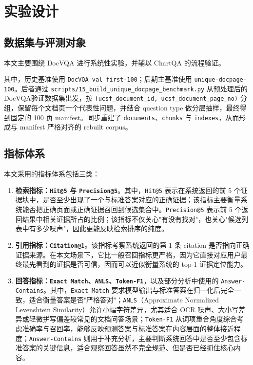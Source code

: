 \documentclass{SYSUReport}
\begin{document}
\section{实验设计}

\subsection{数据集与评测对象}

本文主要围绕 DocVQA 进行系统性实验，并辅以 ChartQA 的流程验证。

其中，历史基准使用 \texttt{DocVQA val first-100}；后期主基准使用 \texttt{unique-docpage-100}。后者通过 \texttt{scripts/15\_build\_unique\_docpage\_benchmark.py} 从预处理后的DocVQA验证数据集出发，按 \texttt{(ucsf\_document\_id, ucsf\_document\_page\_no)} 分组，保留每个文档页一个代表性问题，并结合 question type 做分层抽样，最终得到固定的 100 页 manifest。同步重建了 \texttt{documents}、\texttt{chunks} 与 \texttt{indexes}，从而形成与 manifest 严格对齐的 rebuilt corpus。

\subsection{指标体系}

本文采用的指标体系包括三类：

\begin{enumerate}
    \item \textbf{检索指标：\texttt{Hit@5} 与 \texttt{Precision@5}}。其中，\texttt{Hit@5} 表示在系统返回的前 5 个证据块中，是否至少出现了一个与标准答案对应的正确证据；该指标主要衡量系统能否把正确页面或正确证据召回到候选集合中。\texttt{Precision@5} 表示前 5 个返回结果中相关证据所占的比例；该指标不仅关心"有没有找对"，也关心"候选列表中有多少噪声"，因此更能反映检索排序的纯度。
    \item \textbf{引用指标：\texttt{Citation@1}}。该指标考察系统返回的第 1 条 citation 是否指向正确证据来源。在本文场景下，它比一般召回指标更严格，因为它直接对应用户最终最先看到的证据是否可信，因而可以近似衡量系统的 top-1 证据定位能力。
    \item \textbf{回答指标：\texttt{Exact Match}、\texttt{ANLS}、\texttt{Token-F1}}，以及部分分析中使用的 \texttt{Answer-Contains}。其中，\texttt{Exact Match} 要求模型输出与标准答案在归一化后完全一致，适合衡量答案是否"严格答对"；\texttt{ANLS}（Approximate Normalized Levenshtein Similarity）允许小幅字符差异，尤其适合 OCR 噪声、大小写差异或轻微拼写偏差较常见的文档问答场景；\texttt{Token-F1} 从词项重合角度综合考虑准确率与召回率，能够反映预测答案与标准答案在内容层面的整体接近程度；\texttt{Answer-Contains} 则用于补充分析，主要判断系统回答中是否至少包含标准答案的关键信息，适合观察回答虽然不完全规范、但是否已经抓住核心内容。
\end{enumerate}
\end{document}
